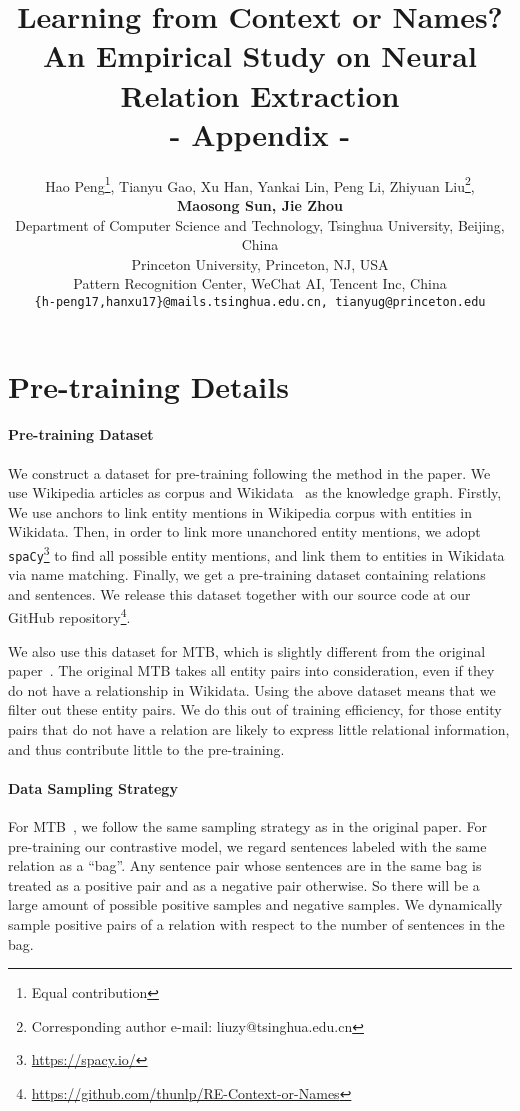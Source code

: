 \documentclass[11pt,a4paper]{article}
\title{Learning from Context or Names?\\An Empirical Study on Neural Relation Extraction \\
- Appendix -}
\author{Hao Peng\thanks{\quad Equal contribution}\hspace{0.5em}, Tianyu Gao, Xu Han, Yankai Lin, Peng Li, Zhiyuan Liu\thanks{\quad Corresponding author e-mail: liuzy@tsinghua.edu.cn}\hspace{0.5em},  \\\textbf{Maosong Sun, Jie Zhou}\\
Department of Computer Science and Technology, Tsinghua University, Beijing, China\\
Princeton University, Princeton, NJ, USA\\
Pattern Recognition Center, WeChat AI, Tencent Inc, China\\
{\tt \{h-peng17,hanxu17\}@mails.tsinghua.edu.cn, tianyug@princeton.edu}
}
\begin{document}
\maketitle

\appendix

\section{Pre-training Details} 
\label{appendix:pretraining}

\paragraph{Pre-training Dataset} We construct a dataset for pre-training following the method in the paper. We use Wikipedia articles as corpus and Wikidata~\citep{vrandevcic2014wikidata} as the knowledge graph. Firstly, We 
use anchors to link entity mentions in Wikipedia corpus with entities in Wikidata. Then, in order to link more unanchored entity mentions, we adopt \texttt{spaCy}\footnote{\url{https://spacy.io/}} to find all possible entity mentions, and link them to entities in Wikidata via name matching. Finally, we get a pre-training dataset containing  relations and  sentences. We release this dataset together with our source code at our GitHub repository\footnote{\url{https://github.com/thunlp/RE-Context-or-Names}}.

We also use this dataset for MTB, which is slightly different from the original paper~\citep{soares2019matching}. The original MTB takes all entity pairs into consideration, even if they do not have a relationship in Wikidata. Using the above dataset means that we filter out these entity pairs. We do this out of training efficiency, for those entity pairs that do not have a relation are likely to express little relational information, and thus contribute little to the pre-training.

\paragraph{Data Sampling Strategy} For MTB~\citep{soares2019matching}, we follow the same sampling strategy as in the original paper.
For pre-training our contrastive model, we regard sentences labeled with the same relation as a ``bag''. Any sentence pair whose sentences are in the same bag is treated as a positive pair and as a negative pair otherwise. So there will be a large amount of possible positive samples and negative samples. We dynamically sample positive pairs of a relation with respect to the number of sentences in the bag. 
\end{document}

